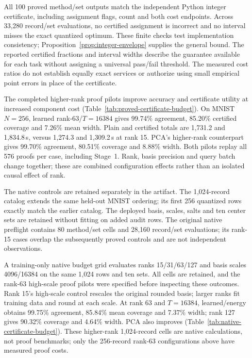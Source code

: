 All 100 proved method/set outputs match the independent Python integer certificate, including assignment flags, count and both cost endpoints. Across 33,280 record/set evaluations, no certified assignment is incorrect and no interval misses the exact quantized optimum. These finite checks test implementation consistency; Proposition~\ref{prop:integer-envelope} supplies the general bound. The reported certified fractions and interval widths describe the guarantee available for each task without assigning a universal pass/fail threshold. The measured cost ratios do not establish equally exact services or authorize using small empirical point errors in place of the certificate.

The completed higher-rank proof pilots improve accuracy and certificate utility at increased component cost (Table~\ref{tab:proved-certificate-budget}). On MNIST $N=256$, learned rank-63/$T=16384$ gives 99.74\% agreement, 85.20\% certified coverage and 7.26\% mean width. Plain and certified totals are 1,731.2 and 1,834.8\,s, versus 1,274.3 and 1,309.2\,s at rank 15. PCA's higher-rank counterpart gives 99.70\% agreement, 80.51\% coverage and 8.88\% width. Both pilots replay all 576 proofs per case, including Stage~1. Rank, basis precision and query batch change together; these are combined configuration effects rather than an isolated causal effect of rank.


The native controls are retained separately in the artifact. The 1,024-record catalog extends the same held-out MNIST ordering; its first 256 quantized rows exactly match the earlier catalog. The deployed basis, scales, salts and ten center sets are retained without fitting on added audit rows. The original native preflight contains 80 method/set cells and 28,160 record/set evaluations; its rank-15 cases overlap the subsequently proved controls and are not independent observations.

A training-only native budget grid evaluates ranks 15/31/63/127 and basis scales 4096/16384 on the same 1,024 rows and ten sets. All cells are retained, and the rank-63 high-scale proof pilots were specified before inspecting these outcomes. Rank 15's high-scale control rescales the original rounded basis; larger ranks fit training data and round at each scale. At rank 63 and $T=16384$, learned/energy obtains 99.75\% agreement, 85.84\% mean coverage and 7.37\% width; rank 127 gives 90.32\% coverage and 4.64\% width. PCA also improves (Table~\ref{tab:native-certificate-budget}). These higher-rank 1,024-record cells are native calculations, not proof benchmarks; only the 256-record rank-63 configurations above have measured proof costs.


